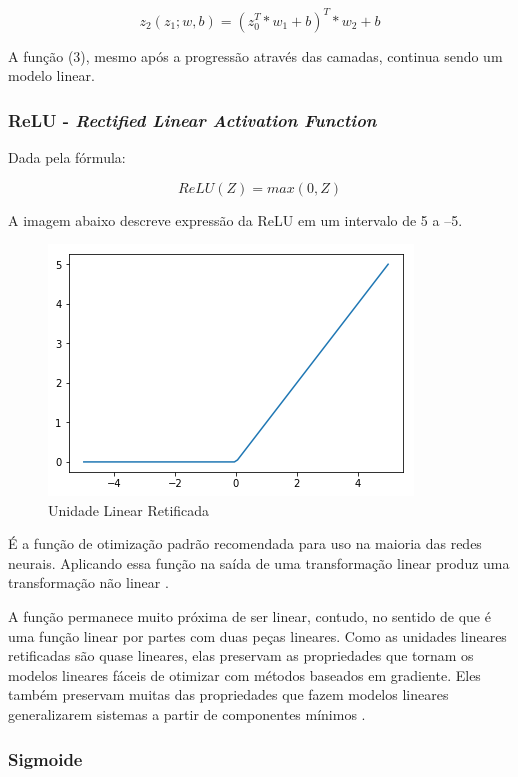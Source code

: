 \documentclass[12pt]{article}
\begin{document}
\begin{equation}
    z_2(z_1; w, b) = (z_0^T * w_1 + b)^T * w_2 + b
\end{equation}

A função (3), mesmo após a progressão através das camadas, continua sendo um modelo linear.

\subsubsection{ReLU - \textit{Rectified Linear Activation Function}}

Dada pela fórmula:

\begin{equation}
    ReLU(Z) = max(0, Z)
\end{equation}

A imagem abaixo descreve expressão da ReLU em um intervalo de 5 a –5.

\begin{figure}[!htb]
\centering
\includegraphics[width=.5\textwidth]{images/relu.png}
\caption{Unidade Linear Retificada}
\label{fig:relu}
\end{figure}

É a função de otimização padrão recomendada para uso na maioria das redes neurais. Aplicando essa função na saída de uma transformação linear produz uma transformação não linear \cite{nair2010rectified}.

A função permanece muito próxima de ser linear, contudo, no sentido de que é uma função linear por partes com duas peças lineares. Como as unidades lineares retificadas são quase lineares, elas preservam as propriedades que tornam os modelos lineares fáceis de otimizar com métodos baseados em gradiente. Eles também preservam muitas das propriedades que fazem modelos lineares generalizarem sistemas a partir de componentes mínimos \cite{Goodfellow-et-al-2016}.


\subsubsection{Sigmoide}
\end{document}
